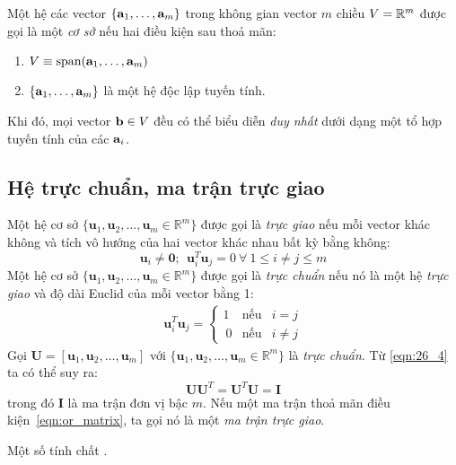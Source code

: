 Một hệ các vector $\{\mathbf{a}_1, \dots, \mathbf{a}_m\}$ trong không gian vector $m$ chiều $V
= \mathbb{R}^m$ được gọi là một \textit{cơ sở} nếu hai điều kiện sau thoả mãn:
\begin{enumerate}
	\item $V \equiv \text{span}(\mathbf{a}_1, \dots, \mathbf{a}_m)$
	\item $\{\mathbf{a}_1, \dots, \mathbf{a}_m\}$ là một hệ độc lập tuyến tính.
\end{enumerate}

Khi đó, mọi vector $\mathbf{b} \in V$ đều có thể biểu diễn \textit{duy nhất} dưới dạng
một tổ hợp tuyến tính của các $\mathbf{a}_i$.
\subsection{Hệ trực chuẩn, ma trận trực giao} %


Một hệ cơ sở $\{\mathbf{u}_1, \mathbf{u}_2,\dots, \mathbf{u}_m \in
\mathbb{R}^m\}$ được gọi là \textit{trực giao} nếu mỗi vector khác không và tích
vô hướng của hai vector khác nhau bất kỳ bằng không:
\begin{equation}
\mathbf{u}_i \neq \mathbf{0}; ~~ \mathbf{u}_i^T \mathbf{u}_j = 0
~ \forall ~1 \leq i \neq j \leq m
\end{equation}
Một hệ cơ sở $\{\mathbf{u}_1, \mathbf{u}_2,\dots, \mathbf{u}_m \in
\mathbb{R}^m\}$ được gọi là \textit{trực chuẩn} nếu nó là một hệ \textit{trực
	giao} và độ dài Euclid của mỗi vector bằng 1:
\begin{eqnarray}
\label{eqn:26_4}
\mathbf{u}_i^T \mathbf{u}_j = \left\{
\begin{matrix}
1 & \text{nếu} &i = j \\\
0 & \text{nếu} &i \neq j
\end{matrix}
\right.
\end{eqnarray}
Gọi $\mathbf{U} = [\mathbf{u}_1, \mathbf{u}_2,\dots, \mathbf{u}_m]$ với
$\{\mathbf{u}_1, \mathbf{u}_2,\dots, \mathbf{u}_m \in \mathbb{R}^m\}$ là
\textit{trực chuẩn}. Từ \eqref{eqn:26_4} ta có thể suy ra:
\begin{equation}
\label{eqn:or_matrix}
\mathbf{UU}^T = \mathbf{U}^T\mathbf{U} = \mathbf{I}
\end{equation}
trong đó $\mathbf{I}$ là ma trận đơn vị bậc $m$. Nếu một ma trận thoả mãn điều
kiện~\eqref{eqn:or_matrix}, ta gọi nó là một \textit{ma trận trực giao}.

Một số tính chất \cite{V1}.

